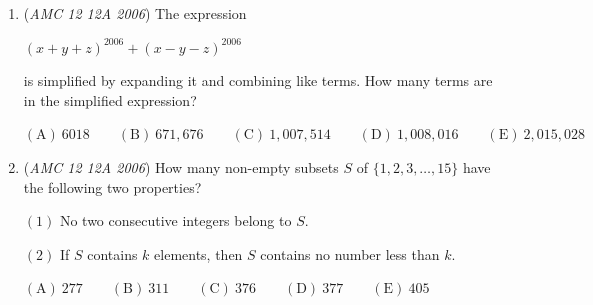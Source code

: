 \begin{enumerate}
 $\mathrm{(A) \ } 1-\frac{\sqrt{2}}{2}\qquad \mathrm{(B) \ } \sqrt{2}-1\qquad \mathrm{(C) \ } \frac{1}{2}\qquad \mathrm{(D) \ } 2-\sqrt{2}\qquad \mathrm{(E) \ }  \frac{\sqrt{2}}{2}$


	\item (\textit{AMC 12 12A 2006}) The expression 


 $(x+y+z)^{2006}+(x-y-z)^{2006}$


 is simplified by expanding it and combining like terms. How many terms are in the simplified expression?


 $\mathrm{(A) \ } 6018\qquad \mathrm{(B) \ } 671,676\qquad \mathrm{(C) \ } 1,007,514\qquad \mathrm{(D) \ } 1,008,016\qquad \mathrm{(E) \ }  2,015,028$


	\item (\textit{AMC 12 12A 2006}) How many non-empty subsets $S$ of $\lbrace 1,2,3,\ldots ,15\rbrace$ have the following two properties? 


 $(1)$  No two consecutive integers belong to $S$.


 $(2)$  If $S$ contains $k$ elements, then $S$ contains no number less than $k$.


 $\mathrm{(A) \ } 277\qquad \mathrm{(B) \ } 311\qquad \mathrm{(C) \ } 376\qquad \mathrm{(D) \ } 377\qquad \mathrm{(E) \ }  405$


\end{enumerate}